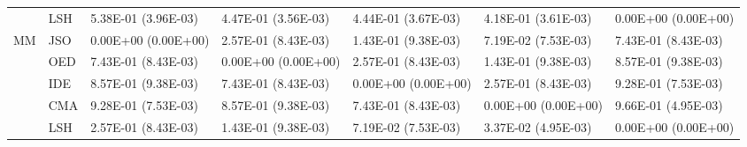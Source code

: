 \begin{tabular}{lllllll}
   & LSH &  5.38E-01 (3.96E-03) &  4.47E-01 (3.56E-03) &  4.44E-01 (3.67E-03) &  4.18E-01 (3.61E-03) &  0.00E+00 (0.00E+00) \\
MM & JSO &  0.00E+00 (0.00E+00) &  2.57E-01 (8.43E-03) &  1.43E-01 (9.38E-03) &  7.19E-02 (7.53E-03) &  7.43E-01 (8.43E-03) \\
   & OED &  7.43E-01 (8.43E-03) &  0.00E+00 (0.00E+00) &  2.57E-01 (8.43E-03) &  1.43E-01 (9.38E-03) &  8.57E-01 (9.38E-03) \\
   & IDE &  8.57E-01 (9.38E-03) &  7.43E-01 (8.43E-03) &  0.00E+00 (0.00E+00) &  2.57E-01 (8.43E-03) &  9.28E-01 (7.53E-03) \\
   & CMA &  9.28E-01 (7.53E-03) &  8.57E-01 (9.38E-03) &  7.43E-01 (8.43E-03) &  0.00E+00 (0.00E+00) &  9.66E-01 (4.95E-03) \\
   & LSH &  2.57E-01 (8.43E-03) &  1.43E-01 (9.38E-03) &  7.19E-02 (7.53E-03) &  3.37E-02 (4.95E-03) &  0.00E+00 (0.00E+00) \\
\bottomrule
\end{tabular}

